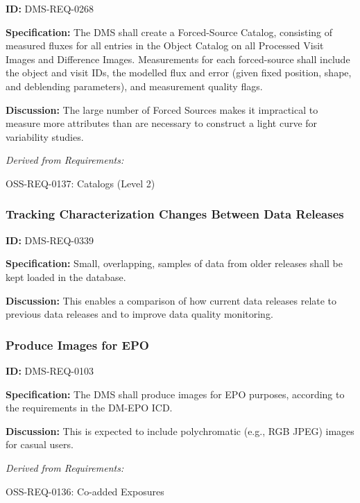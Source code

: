 \documentclass[SE,toc,lsstdraft]{lsstdoc}
\begin{document}
\label{DMS-REQ-0268}
\textbf{ID:} DMS-REQ-0268

\textbf{Specification:} The DMS shall create a Forced-Source Catalog, consisting of measured fluxes for all entries in the Object Catalog on all Processed Visit Images and Difference Images. Measurements for each forced-source shall include the object and visit IDs, the modelled flux and error (given fixed position, shape, and deblending parameters), and measurement quality flags.

\textbf{Discussion: }The large number of Forced Sources makes it impractical to measure more attributes than are necessary to construct a light curve for variability studies.




\emph{Derived from Requirements:}

OSS-REQ-0137:
Catalogs (Level 2) \newline


\subsubsection{Tracking Characterization Changes Between Data Releases}

\label{DMS-REQ-0339}
\textbf{ID:} DMS-REQ-0339

\textbf{Specification:} Small, overlapping, samples of data from older releases shall be kept loaded in the database.

\textbf{Discussion: }This enables a comparison of how current data releases relate to previous data releases and to improve data quality monitoring.




\subsubsection{Produce Images for EPO}

\label{DMS-REQ-0103}
\textbf{ID:} DMS-REQ-0103

\textbf{Specification:} The DMS shall produce images for EPO purposes, according to the requirements in the DM-EPO ICD.

\textbf{Discussion: }This is expected to include polychromatic (e.g., RGB JPEG) images for casual users.




\emph{Derived from Requirements:}

OSS-REQ-0136:
Co-added Exposures \newline
\end{document}
